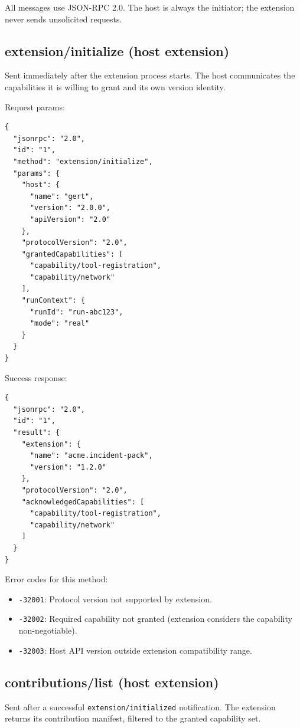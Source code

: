 All messages use JSON-RPC 2.0.  The host is always the initiator; the
extension never sends unsolicited requests.

\subsection{extension/initialize (host \textrightarrow{} extension)}

Sent immediately after the extension process starts.  The host communicates
the capabilities it is willing to grant and its own version identity.

Request params:

\begin{verbatim}
{
  "jsonrpc": "2.0",
  "id": "1",
  "method": "extension/initialize",
  "params": {
    "host": {
      "name": "gert",
      "version": "2.0.0",
      "apiVersion": "2.0"
    },
    "protocolVersion": "2.0",
    "grantedCapabilities": [
      "capability/tool-registration",
      "capability/network"
    ],
    "runContext": {
      "runId": "run-abc123",
      "mode": "real"
    }
  }
}
\end{verbatim}

Success response:

\begin{verbatim}
{
  "jsonrpc": "2.0",
  "id": "1",
  "result": {
    "extension": {
      "name": "acme.incident-pack",
      "version": "1.2.0"
    },
    "protocolVersion": "2.0",
    "acknowledgedCapabilities": [
      "capability/tool-registration",
      "capability/network"
    ]
  }
}
\end{verbatim}

Error codes for this method:

\begin{itemize}
  \item \texttt{-32001}: Protocol version not supported by extension.
  \item \texttt{-32002}: Required capability not granted (extension considers
        the capability non-negotiable).
  \item \texttt{-32003}: Host API version outside extension compatibility range.
\end{itemize}

\subsection{contributions/list (host \textrightarrow{} extension)}

Sent after a successful \texttt{extension/initialized} notification.  The
extension returns its contribution manifest, filtered to the granted capability
set.

